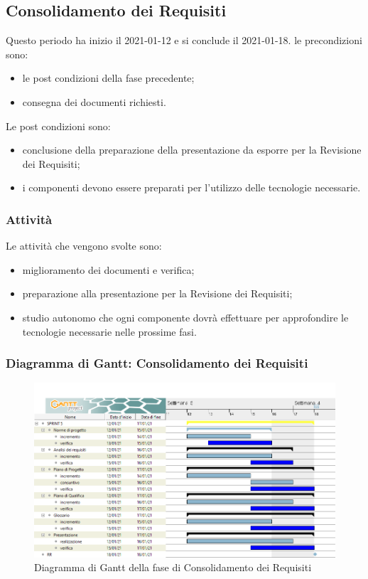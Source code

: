 \newpage
\subsection{Consolidamento dei Requisiti}
Questo periodo ha inizio il 2021-01-12 e si conclude il 2021-01-18.
le precondizioni sono:
\begin{itemize}
	\item le post condizioni della fase precedente;
	\item consegna dei documenti richiesti.
\end{itemize}
Le post condizioni sono:
\begin{itemize}
	\item conclusione della preparazione della presentazione da esporre per la Revisione dei Requisiti;
	\item i componenti devono essere preparati per l'utilizzo delle tecnologie necessarie.
\end{itemize}
\subsubsection{Attività}
Le attività che vengono svolte sono:
\begin{itemize}
	\item miglioramento dei documenti e verifica;
	\item preparazione alla presentazione per la Revisione dei Requisiti;
	\item studio autonomo che ogni componente dovrà effettuare per approfondire le tecnologie necessarie nelle prossime fasi.
\end{itemize}
\subsubsection{Diagramma di Gantt: Consolidamento dei Requisiti}
\begin{figure}[H]
    \centering
    \includegraphics[scale = 0.4]{components/img/consolidamento_requisiti.png}
    \caption{Diagramma di Gantt della fase di Consolidamento dei Requisiti}
    \label{fig:Diagramma di Gantt, fase di Consolidamento dei Requisiti}
\end{figure}


